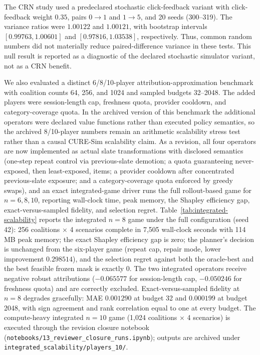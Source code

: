 \documentclass[pdflatex,sn-mathphys-num]{sn-jnl}
\theoremstyle{thmstyleone}
\theoremstyle{thmstyletwo}
\theoremstyle{thmstylethree}
\begin{document}
The CRN study used a predeclared stochastic click-feedback variant with click-feedback weight $0.35$, pairs $0\to1$ and $1\to5$, and 20 seeds (300--319). The variance ratios were $1.00122$ and $1.00121$, with bootstrap intervals $[0.99763,1.00601]$ and $[0.97816,1.03538]$, respectively. Thus, common random numbers did not materially reduce paired-difference variance in these tests. This null result is reported as a diagnostic of the declared stochastic simulator variant, not as a CRN benefit.

We also evaluated a distinct 6/8/10-player attribution-approximation benchmark with coalition counts 64, 256, and 1024 and sampled budgets 32--2048. The added players were session-length cap, freshness quota, provider cooldown, and category-coverage quota. In the archived version of this benchmark the additional operators were declared value functions rather than executed policy semantics, so the archived 8/10-player numbers remain an arithmetic scalability stress test rather than a causal CURE-Sim scalability claim. As a revision, all four operators are now implemented as actual slate transformations with disclosed semantics (one-step repeat control via previous-slate demotion; a quota guaranteeing never-exposed, then least-exposed, items; a provider cooldown after concentrated previous-slate exposure; and a category-coverage quota enforced by greedy swaps), and an exact integrated-game driver runs the full rollout-based game for $n=6,8,10$, reporting wall-clock time, peak memory, the Shapley efficiency gap, exact-versus-sampled fidelity, and selection regret. Table~\ref{tab:integrated-scalability} reports the integrated $n=8$ game under the full configuration (seed 42): 256 coalitions $\times$ 4 scenarios complete in 7,505 wall-clock seconds with 114 MB peak memory; the exact Shapley efficiency gap is zero; the planner's decision is unchanged from the six-player game (repeat cap, repair mode, lower improvement $0.298514$), and the selection regret against both the oracle-best and the best feasible frozen mask is exactly $0$. The two integrated operators receive negative robust attributions ($-0.065577$ for session-length cap, $-0.050246$ for freshness quota) and are correctly excluded. Exact-versus-sampled fidelity at $n=8$ degrades gracefully: MAE $0.001290$ at budget 32 and $0.000199$ at budget 2048, with sign agreement and rank correlation equal to one at every budget. The compute-heavy integrated $n=10$ game (1,024 coalitions $\times$ 4 scenarios) is executed through the revision closure notebook (\texttt{notebooks/13\_reviewer\_closure\_runs.ipynb}); outputs are archived under \texttt{integrated\_scalability/players\_10/}.
\end{document}
